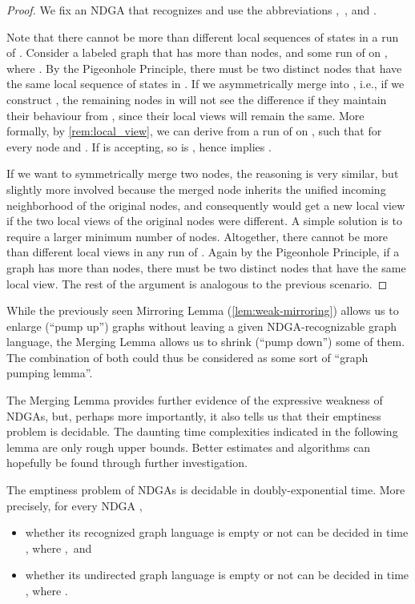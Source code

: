 \documentclass[a4paper,11pt,twoside]{report} \pdfoutput=1
\begin{document}
\begin{proof}
  We fix an NDGA  that recognizes  and use
  the abbreviations ,\, , and .

  Note that there cannot be more than  different local
  sequences of states in a run of . Consider a labeled graph
   that has more than  nodes, and
  some run  of  on , where
  . By the Pigeonhole Principle, there must be two distinct nodes
   that have the same local sequence of states in . If we
  asymmetrically merge  into , i.e., if we construct
  , the remaining nodes in  will not
  see the difference if they maintain their behaviour from , since
  their local views will remain the same. More formally, by
  \cref{rem:local_view}, we can derive from  a run
   of  on , such that
   for every node  and . If  is
  accepting, so is , hence  implies .

  If we want to symmetrically merge two nodes, the reasoning is very
  similar, but slightly more involved because the merged node inherits
  the unified incoming neighborhood of the original nodes, and
  consequently would get a new local view if the two local views of
  the original nodes were different. A simple solution is to require a
  larger minimum number of nodes. Altogether, there cannot be more
  than  different local views in any run of
  . Again by the Pigeonhole Principle, if a graph has more than
   nodes, there must be two distinct nodes that
  have the same local view. The rest of the argument is analogous to
  the previous scenario.
\end{proof}

While the previously seen Mirroring Lemma (\cref{lem:weak-mirroring})
allows us to enlarge (“pump up”) graphs without leaving a given
NDGA-recognizable graph language, the Merging Lemma allows us to
shrink (“pump down”) some of them. The combination of both could thus
be considered as some sort of “graph pumping lemma”.

The Merging Lemma provides further evidence of the expressive weakness
of NDGAs, but, perhaps more importantly, it also tells us that their
emptiness problem is decidable. The daunting time complexities
indicated in the following lemma are only rough upper bounds. Better
estimates and algorithms can hopefully be found through further
investigation.

\begin{lemma} \label{lem:ndga-emptiness}
  The emptiness problem of NDGAs is decidable in doubly-exponential
  time. More precisely, for every NDGA ,
  \begin{itemize}
  \item whether its recognized graph language  is empty or not
    can be decided in time \!, where ,\, and
  \item whether its undirected graph language  is empty
    or not can be decided in time \!\!, where
    .
  \end{itemize}
\end{lemma}
\end{document}
